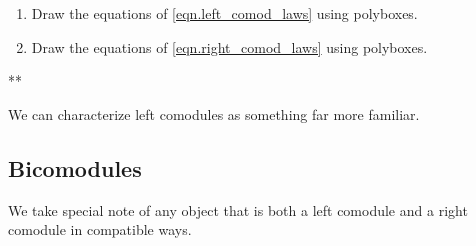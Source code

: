 \documentclass[Book-Poly]{subfiles}
\begin{document}
\begin{exercise}
\begin{enumerate}
	\item Draw the equations of \eqref{eqn.left_comod_laws} using polyboxes.
	\item Draw the equations of \eqref{eqn.right_comod_laws} using polyboxes.
\qedhere
\end{enumerate}
\begin{solution}
**
\end{solution}
\end{exercise}

We can characterize left comodules as something far more familiar.

\begin{proposition}

\end{proposition}


\subsection{Bicomodules}

We take special note of any object that is both a left comodule and a right comodule in compatible ways.
\end{document}

